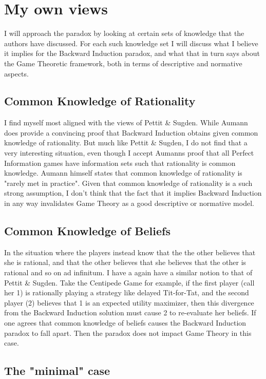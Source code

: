 \documentclass{article}
\begin{document}
\section{My own views}
I will approach the paradox by looking at certain sets of knowledge that the authors have discussed. For each such knowledge set I will discuss what I believe it implies for the Backward Induction paradox, and what that in turn says about the Game Theoretic framework, both in terms of descriptive and normative aspects.

\subsection{Common Knowledge of Rationality}

I find myself most aligned with the views of Pettit \& Sugden. While Aumann does provide a convincing proof that Backward Induction obtains given common knowledge of rationality. But much like Pettit \& Sugden, I do not find that a very interesting situation, even though I accept Aumanns proof that all Perfect Information games have information sets such that rationality is common knowledge. Aumann himself states that common knowledge of rationality is "rarely met in practice". Given that common knowledge of rationality is a such strong assumption, I don't think that the fact that it implies Backward Induction in any way invalidates Game Theory as a good descriptive or normative model.

\subsection{Common Knowledge of Beliefs}

In the situation where the players instead know that the the other believes that she is rational, and that the other believes that she believes that the other is rational and so on ad infinitum. I have a again have a similar notion to that of Pettit \& Sugden. Take the Centipede Game for example, if the first player (call her 1) is rationally playing a strategy like delayed Tit-for-Tat, and the second player (2) believes that 1 is an expected utility maximizer, then this divergence from the Backward Induction solution must cause 2 to re-evaluate her beliefs. If one agrees that common knowledge of beliefs causes the Backward Induction paradox to fall apart. Then the paradox does not impact Game Theory in this case.

\subsection{The "minimal" case}
\end{document}
